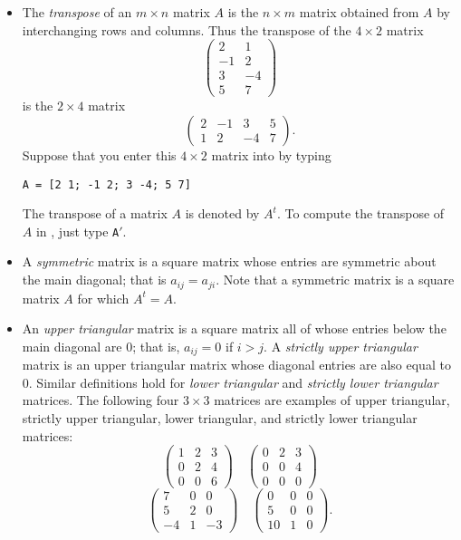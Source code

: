 \documentclass{ximera}
\begin{document}
\begin{itemize}
\item The {\em transpose\/} of an $m\times n$
matrix $A$ is the $n\times m$ matrix obtained from $A$ by
interchanging rows and columns.  Thus the transpose of the
$4\times 2$ matrix
\[
\left(\begin{array}{rr} 2 & 1 \\ -1 & 2 \\ 3 & -4 \\ 5 & 7
\end{array}\right)
\]
is the $2\times 4$ matrix
\[
\left(\begin{array}{rrrr} 2 & -1 & 3 & 5 \\ 1 & 2 & -4 & 7
\end{array}\right).
\]
Suppose that you enter this $4\times 2$ matrix into \Matlab by
typing
\begin{verbatim}
A = [2 1; -1 2; 3 -4; 5 7]
\end{verbatim}
The transpose of a matrix $A$ is denoted by $A^t$.  To compute
the transpose of $A$ in \Matlabp, just type {\tt A$'$}.

\item A {\em symmetric\/} matrix is a
square matrix whose entries are symmetric about the main
diagonal; that is $a_{ij}=a_{ji}$.  Note that a symmetric matrix
is a square matrix $A$ for which $A^t=A$.

\item An {\em upper triangular\/} matrix is a square matrix all of whose entries below the
main diagonal are $0$; that is, $a_{ij}=0$ if $i>j$.  A {\em
strictly upper triangular\/} matrix is an upper triangular
matrix whose diagonal entries are also equal to $0$.  Similar
definitions hold for {\em lower triangular\/}
and {\em strictly lower triangular\/} matrices.  The following four 
$3\times 3$ matrices are examples of upper triangular, strictly upper 
triangular, lower triangular, and strictly lower triangular matrices:
\[
\left(\begin{array}{rrr} 1 & 2 & 3\\ 0 & 2 & 4\\ 0 & 0 & 6\end{array}\right)
\quad
\left(\begin{array}{rrr} 0 & 2 & 3\\ 0 & 0 & 4\\ 0 & 0 & 0\end{array}\right)
\]
\[
\left(\begin{array}{rrr} 7 & 0 & 0\\ 5 & 2 & 0\\ -4 & 1 & -3\end{array}\right)
\quad
\left(\begin{array}{rrr} 0 & 0 & 0\\ 5 & 0 & 0\\ 10 & 1 & 0\end{array}\right).
\]


\end{itemize}
\end{document}
